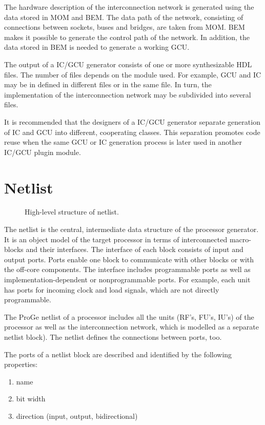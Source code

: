 \documentclass[a4paper,twoside]{tce}
\begin{document}
The hardware description of the interconnection network is generated using
the data stored in MOM and BEM. The data path of the network, consisting of
connections between sockets, buses and bridges, are taken from MOM. BEM
makes it possible to generate the control path of the network. In addition,
the data stored in BEM is needed to generate a working GCU.

The output of a IC/GCU generator consists of one or more synthesizable HDL
files. The number of files depends on the module used. For example, GCU and
IC may be in defined in different files or in the same file. In turn, the
implementation of the interconnection network may be subdivided into several
files.

It is recommended that the designers of a IC/GCU generator separate
generation of IC and GCU into different, cooperating classes. This
separation promotes code reuse when the same GCU or IC generation process is
later used in another IC/GCU plugin module.

\section{Netlist}
\label{sec:netlist}

\begin{figure}[tb]
\centerline{}
\caption{High-level structure of netlist.}
\label{fig:netlist}
\end{figure}

The netlist is the central, intermediate data structure of the processor
generator. It is an object model of the target processor in terms of
interconnected macro-blocks and their interfaces.
%
The interface of each block consists of input and output ports. Ports enable
one block to communicate with other blocks or with the off-core
components. The interface includes programmable ports as well as
implementation-dependent or nonprogrammable ports. For example, each unit
has ports for incoming clock and load signals, which are not directly
programmable.

The ProGe netlist of a processor includes all the units (RF's, FU's, IU's)
of the processor as well as the interconnection network, which is modelled
as a separate netlist block).
%
The netlist defines the connections between ports, too.

The ports of a netlist block are described and identified by the following
properties:
\begin{enumerate}
\item name
\item bit width
\item direction (input, output, bidirectional)
\end{enumerate}
\end{document}

